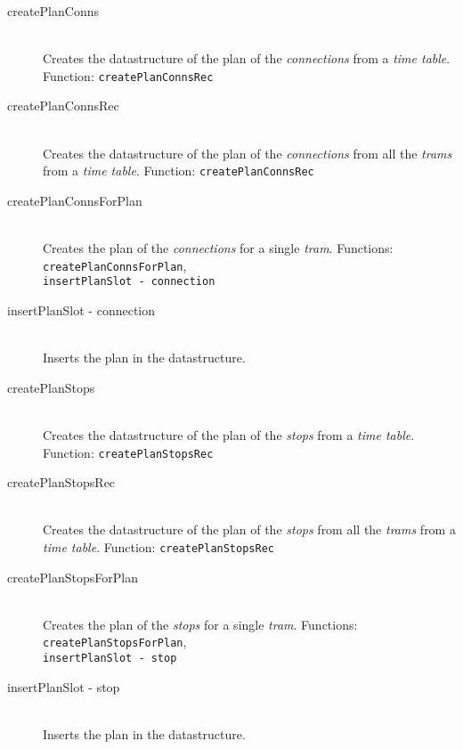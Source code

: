 \documentclass[a4]{article}
\begin{document}
\begin{description}
    \item[createPlanConns] \hfill \\ Creates the datastructure of the plan of the \emph{connections} from a \emph{time table}. Function: \verb=createPlanConnsRec=
    \item[createPlanConnsRec] \hfill \\ Creates the datastructure of the plan of the \emph{connections} from all the \emph{trams} from a \emph{time table}. Function: \verb=createPlanConnsRec=
    \item[createPlanConnsForPlan] \hfill \\ Creates the plan of the \emph{connections} for a single \emph{tram}. Functions: \verb=createPlanConnsForPlan=, \\ \verb=insertPlanSlot - connection=
    \item[insertPlanSlot - connection] \hfill \\ Inserts the plan in the datastructure.
    \item[createPlanStops] \hfill \\ Creates the datastructure of the plan of the \emph{stops} from a \emph{time table}. Function: \verb=createPlanStopsRec=
    \item[createPlanStopsRec] \hfill \\ Creates the datastructure of the plan of the \emph{stops} from all the \emph{trams} from a \emph{time table}. Function: \verb=createPlanStopsRec=
    \item[createPlanStopsForPlan] \hfill \\ Creates the plan of the \emph{stops} for a single \emph{tram}. Functions: \verb=createPlanStopsForPlan=, \\ \verb=insertPlanSlot - stop=
    \item[insertPlanSlot - stop] \hfill \\ Inserts the plan in the datastructure.
\end{description}
\end{document}
